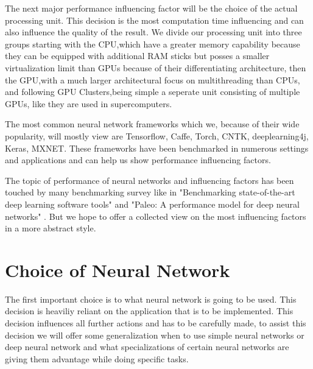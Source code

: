 \documentclass[conference]{IEEEtran}
\begin{document}




The next major performance influencing factor will be the choice of the actual processing unit. This decision is the most computation time influencing and can also influence the quality of the result. We divide our processing unit into three groups starting with the CPU,which have a greater memory capability because they can be equipped with additional RAM sticks but posses a smaller virtualization limit than GPUs because of their differentiating architecture, then the GPU,with a much larger architectural focus on multithreading than CPUs, and following GPU Clusters,being simple a seperate unit consisting of multiple GPUs, like they are used in supercomputers.



The most common neural network frameworks which we, because of their wide popularity, will mostly view are Tensorflow\cite{abadi2016tensorflow}, Caffe\cite{jia2014caffe}, Torch\cite{collobert2002torch}, CNTK\cite{gitcntk}, deeplearning4j\cite{websitedl4j}, Keras\cite{websitekeras}, MXNET\cite{websitemxnet}. These frameworks have been benchmarked in numerous settings and applications and can help us show performance influencing factors.




The topic of performance of neural networks and influencing factors has been touched by many benchmarking survey like in "Benchmarking state-of-the-art deep learning software tools" \cite{shi2016benchmarking} and "Paleo: A performance model for deep neural networks" \cite{qi2016paleo}.	 But we hope to offer a collected view on the most influencing factors in a more abstract style.




\section{Choice of Neural Network}	

The first important choice is to what neural network is going to be used. This decision is heaviliy reliant on the application that is to be implemented. This decision influences all further actions and has to be carefully made, to assist this decision we will offer some generalization when to use simple neural networks or deep neural network and what specializations of certain neural networks are giving them advantage while doing specific tasks.
\end{document}
